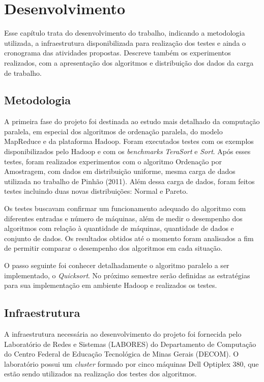 \chapter{Desenvolvimento}
\label{cap:desenvolvimento}

Esse capítulo trata do desenvolvimento do trabalho, indicando a metodologia utilizada, a infraestrutura disponibilizada para realização dos testes e ainda o cronograma das atividades propostas. Descreve também os experimentos realizados, com a apresentação dos algoritmos e distribuição dos dados da carga de trabalho.

\section{Metodologia}

A primeira fase do projeto foi destinada ao estudo mais detalhado da computação paralela, em especial dos algoritmos de ordenação paralela, do modelo MapReduce e da plataforma Hadoop. Foram executados testes com os exemplos disponibilizados pelo Hadoop e com os \textit{benchmarks} \textit{TeraSort} e \textit{Sort}. 
Após esses testes, foram realizados experimentos com o algoritmo Ordenação por Amostragem, com dados em distribuição uniforme, mesma carga de dados utilizada no trabalho de Pinhão (2011). Além dessa carga de dados, foram feitos testes incluindo duas novas distribuições: Normal e Pareto. 

Os testes buscavam confirmar um funcionamento adequado do algoritmo com diferentes entradas e número de máquinas, além de medir o desempenho dos algoritmos com relação à quantidade de máquinas, quantidade de dados e conjunto de dados. Os resultados obtidos até o momento foram analisados a fim de permitir comparar o desempenho dos algoritmos em cada situação.
 
O passo seguinte foi conhecer detalhadamente o algoritmo paralelo a ser implementado, o \textit{Quicksort}.  No próximo semestre serão definidas as estratégias para sua implementação em ambiente Hadoop e realizados os testes.

\section{Infraestrutura}

A infraestrutura necessária ao desenvolvimento do projeto foi fornecida pelo Laboratório de Redes e Sistemas (LABORES) do Departamento de Computação do Centro Federal de Educação Tecnológica de Minas Gerais (DECOM). O laboratório possui um \textit{cluster} formado por cinco máquinas Dell Optiplex 380, que estão sendo utilizados na realização dos testes dos algoritmos. 

